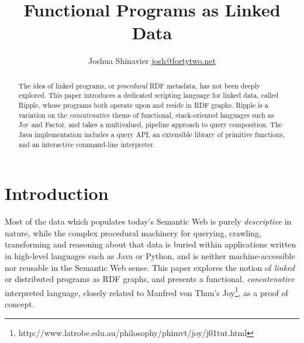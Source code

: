 \documentclass[runningheads]{llncs}
\begin{document}
\mainmatter  %


\title{Functional Programs as Linked Data}


%
%
\author{
Joshua Shinavier
\newline
\url{josh@fortytwo.net}}
%


%
%

\maketitle


\begin{abstract}
The idea of linked programs, or \textit{procedural} RDF metadata, has not been deeply explored.  This paper introduces a dedicated scripting language for linked data, called Ripple, whose programs both operate upon and reside in RDF graphs.  Ripple is a variation on the \textit{concatenative} theme of functional, stack-oriented languages such as Joy and Factor, and takes a multivalued, pipeline approach to query composition.  The Java implementation includes a query API, an extensible library of primitive functions, and an interactive command-line interpreter.
\end{abstract}

\section{Introduction}
Most of the data which populates today's Semantic Web is purely \textit{descriptive} in nature, while the complex procedural machinery for querying, crawling, transforming and reasoning about that data is buried within applications written in high-level languages such as Java or Python, and is neither machine-accessible nor reusable in the Semantic Web sense.  This paper explores the notion of \textit{linked} or distributed programs as RDF graphs, and presents a functional, \textit{concatenative} interpreted language, closely related to Manfred von Thun's Joy\footnote{http://www.latrobe.edu.au/philosophy/phimvt/joy/j01tut.html}, as a proof of concept.
\end{document}
